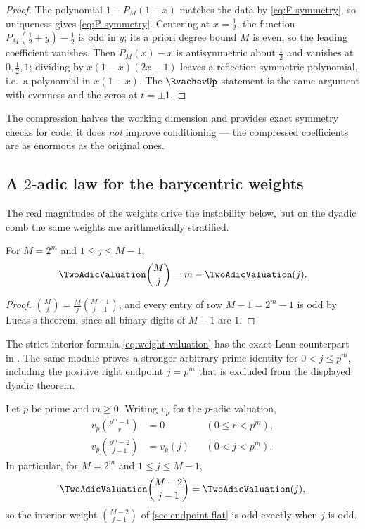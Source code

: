 \begin{proof}
The polynomial $1-P_M(1-x)$ matches the data by
\eqref{eq:F-symmetry}, so uniqueness gives \eqref{eq:P-symmetry}.
Centering at $x=\tfrac12$, the function $P_M(\tfrac12+y)-\tfrac12$ is
odd in $y$; its a priori degree bound $M$ is even, so the leading
coefficient vanishes.  Then $P_M(x)-x$ is antisymmetric about
$\tfrac12$ and vanishes at $0,\tfrac12,1$; dividing by
$x(1-x)(2x-1)$ leaves a reflection-symmetric polynomial, i.e.\ a
polynomial in $x(1-x)$.  The $\RvachevUp$ statement is the same argument
with evenness and the zeros at $t=\pm1$.
\end{proof}

The compression halves the working dimension and provides exact
symmetry checks for code; it does \emph{not} improve conditioning ---
the compressed coefficients are as enormous as the original ones.

\subsection{A $2$-adic law for the barycentric weights}

The real magnitudes of the weights drive the instability below, but on
the dyadic comb the same weights are arithmetically stratified.

\begin{theorem}
\label{thm:weight-valuation}
For $M=2^{m}$ and $1\le j\le M-1$,
\begin{equation}
 \TwoAdicValuation\binom Mj=m-\TwoAdicValuation(j).
 \label{eq:weight-valuation}
\end{equation}
\end{theorem}

\begin{proof}
$\binom Mj=\frac Mj\binom{M-1}{j-1}$, and every entry of row
$M-1=2^{m}-1$ is odd by Lucas's theorem, since all binary digits of
$M-1$ are $1$.
\end{proof}

The strict-interior formula \eqref{eq:weight-valuation} has the exact Lean
counterpart  in
.  The same module proves a
stronger arbitrary-prime identity for $0<j\le p^m$, including the positive
right endpoint $j=p^m$ that is excluded from the displayed dyadic theorem.

\begin{proposition}
\label{prop:prime-power-companion-rows}
Let $p$ be prime and $m\ge0$.  Writing $v_p$ for the $p$-adic valuation,
\begin{align*}
 v_p\binom{p^m-1}{r}&=0 &&(0\le r<p^m),\\
 v_p\binom{p^m-2}{j-1}&=v_p(j) &&(0<j<p^m).
\end{align*}
In particular, for $M=2^m$ and $1\le j\le M-1$,
\[
 \TwoAdicValuation\binom{M-2}{j-1}=\TwoAdicValuation(j),
\]
so the interior weight $\binom{M-2}{j-1}$ of
\cref{sec:endpoint-flat} is odd exactly when $j$ is odd.
\end{proposition}

